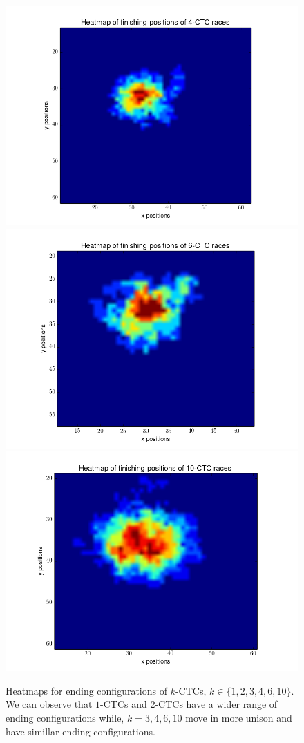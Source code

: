 \documentclass[12pt]{article}
\begin{document}
\begin{figure}[h]
	\includegraphics[scale=0.40]{img/4ctc_heat}
	\includegraphics[scale=0.40]{img/6ctc_heat}
	\includegraphics[scale=0.40]{img/10ctc_heat}
	\caption{Heatmaps for ending configurations of $k$-CTCs, $k\in\{1,2,3,4,6,10\}$. We can observe that $1$-CTCs and $2$-CTCs have a wider range of ending configurations while, $k=3,4,6,10$ move in more unison and have simillar ending configurations.}
	\label{heatmap}
\end{figure}
\end{document}
